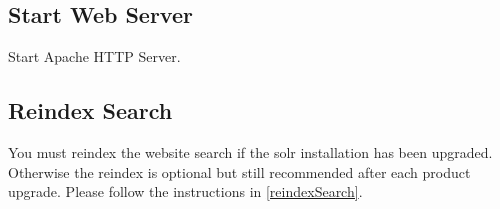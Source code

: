 \documentclass[12pt]{article}
\begin{document}
\subsection{Start Web Server}
Start Apache HTTP Server.

\subsection{Reindex Search}

You must reindex the website search if the solr installation has been upgraded. Otherwise the reindex is optional but still recommended after each product upgrade. Please follow the instructions in \ref{reindexSearch}.
\end{document}
